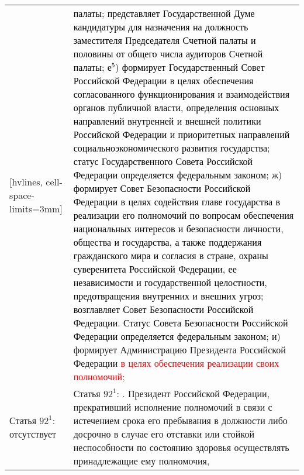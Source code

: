 \documentclass[a4paper,14pt]{extarticle}
\begin{document}
	\pagebreak
	\noindent
	\begin{NiceTabular}{p{92mm}p{91mm}}[hvlines, cell-space-limits=3mm]
		& \textcolor{black}{палаты; представляет Государственной Думе кандидатуры для назначения на должность заместителя Председателя Счетной палаты и половины от общего числа аудиторов Счетной палаты;} \newline
		\textcolor{black}{е$^5$) формирует Государственный Совет Российской Федерации в целях обеспечения согласованного функционирования и взаимодействия органов публичной власти, определения основных направлений внутренней и внешней политики Российской Федерации и приоритетных направлений социальноэкономического развития государства; статус Государственного Совета Российской Федерации определяется федеральным законом;} \newline
		ж) \textcolor{black}{формирует Совет Безопасности Российской Федерации в целях содействия главе государства в реализации его полномочий по вопросам обеспечения национальных интересов и безопасности личности, общества и государства, а также поддержания гражданского мира и согласия в стране, охраны суверенитета Российской Федерации, ее независимости и государственной целостности, предотвращения внутренних и внешних угроз; возглавляет Совет Безопасности Российской Федерации. Статус Совета Безопасности Российской Федерации определяется федеральным законом;} \newline
		и) формирует Администрацию Президента Российской Федерации \textcolor{red}{в целях обеспечения реализации своих полномочий;} \\
		Статья $92^1$: \newline
		отсутствует &
		Статья $92^1$: . Президент Российской Федерации, прекративший исполнение полномочий в связи с истечением срока его пребывания в должности либо досрочно в случае его отставки или стойкой неспособности по состоянию здоровья осуществлять принадлежащие ему полномочия,
	\end{NiceTabular}
	
\end{document}
